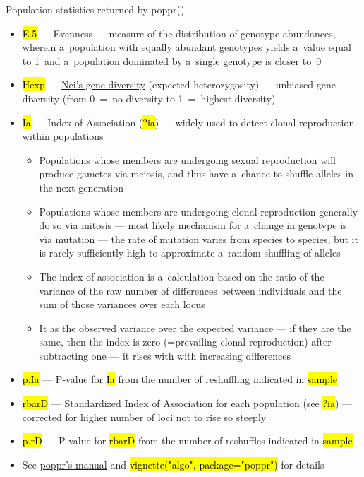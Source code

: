 \documentclass[compress, ucs, xelatex, 11pt, xcolor=svgnames,
  hyperref={
    bookmarks=true,
    unicode=true,
    colorlinks=true,
    pdftitle={Molecular data in R},
    plainpages=false,
    pdfauthor={Vojtech Zeisek},
    pdfsubject={Course about phylogeny and evolution in R},
    pdfcreator={XeLaTeX},
    pdfkeywords={R, evolution, phylogeny, molecular data},
    linkcolor=Tomato,
    anchorcolor=SaddleBrown,
    citecolor=Goldenrod,
    filecolor=DarkMagenta,
    menucolor=Sienna,
    urlcolor=DarkTurquoise,
    pdftex},
  url={hyphens, lowtilde} %
  ]{beamer}
\renewcommand{\texttt}[1]{\hl{\ttfamily #1}}
\begin{document}
\begin{frame}[allowframebreaks]{Population statistics returned by poppr()}
\begin{itemize}
    \item \texttt{E.5} --- Evenness --- measure of the distribution of genotype abundances, wherein a~population with equally abundant genotypes yields a~value equal to 1~and a~population dominated by a~single genotype is closer to~0
    \item \texttt{Hexp} --- \href{http://www.genetics.org/content/89/3/583}{Nei's gene diversity} (expected heterozygosity) --- unbiased gene diversity (from 0~=~no diversity to 1~=~highest diversity)
    \item \texttt{Ia} --- Index of Association (\texttt{?ia}) --- widely used to detect clonal reproduction within populations
    \begin{itemize}
      \item Populations whose members are undergoing sexual reproduction will produce gametes via meiosis, and thus have a~chance to shuffle alleles in the next generation
      \item Populations whose members are undergoing clonal reproduction generally do so via mitosis --- most likely mechanism for a~change in genotype is via mutation --- the rate of mutation varies from species to species, but it is rarely sufficiently high to approximate a~random shuffling of alleles
      \item The index of association is a~calculation based on the ratio of the variance of the raw number of differences between individuals and the sum of those variances over each locus
      \item It as the observed variance over the expected variance --- if they are the same, then the index is zero (=prevailing clonal reproduction) after subtracting one --- it rises with with increasing differences
    \end{itemize}
    \item \texttt{p.Ia} --- P-value for \texttt{Ia} from the number of reshuffling indicated in \texttt{sample}
    \item \texttt{rbarD} --- Standardized Index of Association for each population (see \texttt{?ia}) --- corrected for higher number of loci not to rise so steeply
    \item \texttt{p.rD} --- P-value for \texttt{rbarD} from the number of reshuffles indicated in \texttt{sample}
    \item See \href{https://grunwaldlab.github.io/Population_Genetics_in_R/}{poppr's manual} and \texttt{vignette("algo", package="poppr")} for details
  \end{itemize}
\end{frame}
\end{document}

